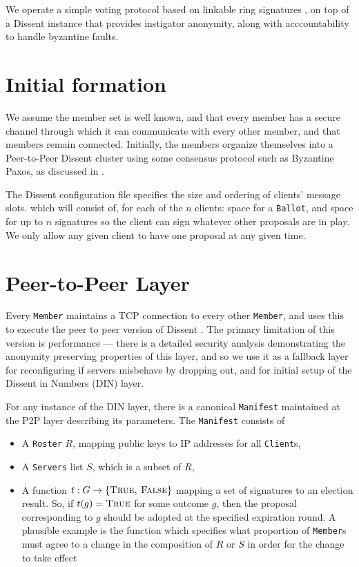 We operate a simple voting protocol based on linkable ring signatures
\cite{lrs}, on top of a Dissent instance that provides instigator anonymity,
along with acccountability to handle byzantine faults.
\section{Initial formation}
We assume the member set is well known, and that every member has a secure
channel through which it can communicate with every other member, and that
members remain connected. Initially, the
members organize themselves into a Peer-to-Peer Dissent
cluster \cite{p2pd} using some consensus protocol such
as Byzantine Paxos, as discussed in \cite{sec}.

The Dissent configuration file specifies the size and ordering of clients'
message slots. which will
consist of, for each of the $n$ clients: space for a \texttt{Ballot}, and space
for up to $n$ signatures so the client can sign whatever other proposals are in
play.  We only allow any given client to have one proposal at any given time.

\section{Peer-to-Peer Layer}
Every \texttt{Member} maintains a TCP connection to every other \texttt{Member},
and uses this to execute the peer to peer version of Dissent \cite{sec}. The
primary limitation of this version is performance --- there is a detailed
security analysis demonstrating the anonymity preserving properties of this
layer, and so we use it as a fallback layer for reconfiguring if servers
misbehave by dropping out, and for initial setup of the Dissent in Numbers (DIN)
layer.

For any instance of the DIN layer, there is a canonical \texttt{Manifest}
maintained at the P2P layer describing its parameters. The \texttt{Manifest}
consists of
\begin{itemize}
  \item A \texttt{Roster} $R$, mapping public keys to IP addresses for all
    \texttt{Client}s,
  \item A \texttt{Servers} list $S$, which is a subset of $R$,
  \item A function $t : G \to \{\textsc{True, False}\}$ mapping a set of
    signatures to an election result. So, if $t(g) = \textsc{True}$ for some
    outcome $g$, then the proposal corresponding to $g$ should
    be adopted at the specified expiration round. A plausible example is the
    function which specifies what proportion of \texttt{Member}s must agree to a
    change in the composition of $R$ or $S$ in order for the change to take
    effect
\end{itemize}

